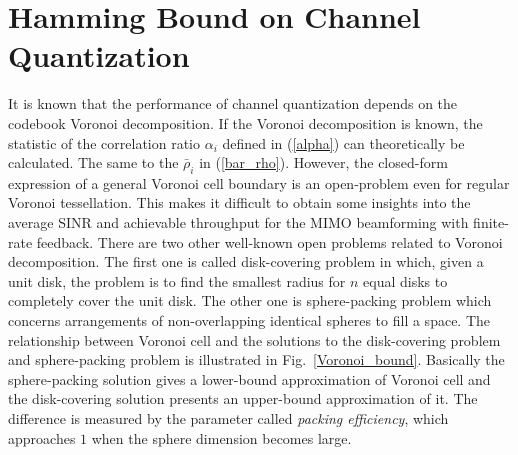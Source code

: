\documentclass[10pt,fleqn, twocolumn]{IEEEtran}
\begin{document}
\section{Hamming Bound on Channel Quantization}
\begin{figure}
\end{figure}
It is known that the performance of channel quantization depends
on the codebook Voronoi decomposition. If the Voronoi
decomposition is known, the statistic of the correlation ratio
$\alpha_i$ defined in (\ref{alpha}) can theoretically be
calculated. The same to the $\bar\rho_{i}$ in (\ref{bar_rho}).
However, the closed-form expression of a general Voronoi cell
boundary is an open-problem even for regular Voronoi tessellation.
This makes it difficult to obtain some insights into the average
SINR and achievable throughput for the MIMO beamforming with
finite-rate feedback. There are two other well-known open problems
related to Voronoi decomposition. The first one is called
disk-covering problem in which, given a unit disk, the problem is
to find the smallest radius for $n$ equal disks to completely
cover the unit disk. The other one is sphere-packing problem which
concerns arrangements of non-overlapping identical spheres to fill
a space. The relationship between Voronoi cell and the solutions
to the disk-covering problem and sphere-packing problem is
illustrated in Fig.~\ref{Voronoi_bound}. Basically the
sphere-packing solution gives a lower-bound approximation of
Voronoi cell and the disk-covering solution presents an
upper-bound approximation of it. The difference is measured by the
parameter called {\em packing efficiency}, which approaches $1$
when the sphere dimension becomes large.
\end{document}

